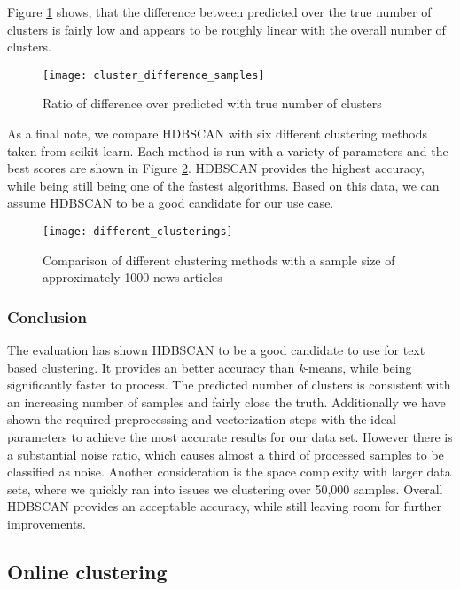 Figure \ref{fig:cluster_difference_samples} shows, that the difference between predicted over the true number of clusters is fairly low and appears to be roughly linear with the overall number of clusters.  

\begin{figure}[h]
    \centering
    \texttt{[image: cluster\_difference\_samples]}
    \caption{Ratio of difference over predicted with true number of clusters}
    \label{fig:cluster_difference_samples}
\end{figure}



As a final note, we compare HDBSCAN with six different clustering methods taken from scikit-learn. Each method is run with a variety of parameters and the best scores are shown in Figure \ref{fig:different_clusterings}. HDBSCAN provides the highest accuracy, while being still being one of the fastest algorithms. Based on this data, we can assume HDBSCAN to be a good candidate for our use case.

\begin{figure}[h]
    \centering
    \texttt{[image: different\_clusterings]}
    \caption{Comparison of different clustering methods with a sample size of approximately 1000 news articles}
    \label{fig:different_clusterings}
\end{figure}

\subsubsection{Conclusion}

The evaluation has shown HDBSCAN to be a good candidate to use for text based clustering. It provides an better accuracy than \textit{k}-means, while being significantly faster to process. The predicted number of clusters is consistent with an increasing number of samples and fairly close the truth. Additionally we have shown the required preprocessing and vectorization steps with the ideal parameters to achieve the most accurate results for our data set. However there is a substantial noise ratio, which causes almost a third of processed samples to be classified as noise. Another consideration is the space complexity  with larger data sets, where we quickly ran into issues we clustering over 50,000 samples. Overall HDBSCAN provides an acceptable accuracy, while still leaving room for further improvements.

\subsection{Online clustering}

